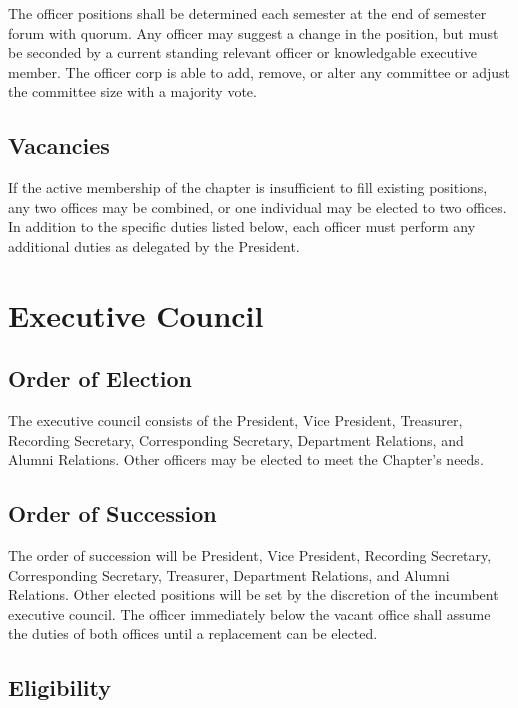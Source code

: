\documentclass[11pt]{article}
\begin{document}
The officer positions shall be determined each semester at the end of semester forum with quorum.
Any officer may suggest a change in the position, but must be seconded by a current standing relevant officer or knowledgable executive member.
The officer corp is able to add, remove, or alter any committee or adjust the committee size with a majority vote.

\subsection{Vacancies}
\label{sec:orgd60b671}

If the active membership of the chapter is insufficient to fill existing positions, any two offices may be combined, or one individual may be elected to two offices.
In addition to the specific duties listed below, each officer must perform any additional duties as delegated by the President.
\section{Executive Council}
\label{sec:org39363bd}

\subsection{Order of Election}
\label{sec:orgda9be6b}

The executive council consists of the President, Vice President, Treasurer, Recording Secretary, Corresponding Secretary, Department Relations, and Alumni Relations. Other officers may be elected to meet the Chapter’s needs.

\subsection{Order of Succession}
\label{sec:org365b4b5}

The order of succession will be President, Vice President, Recording Secretary, Corresponding Secretary, Treasurer, Department Relations, and Alumni Relations.
Other elected positions will be set by the discretion of the incumbent executive council.
The officer immediately below the vacant office shall assume the duties of both offices until a replacement can be elected.

\subsection{Eligibility}
\label{sec:org722c3bb}
\end{document}
